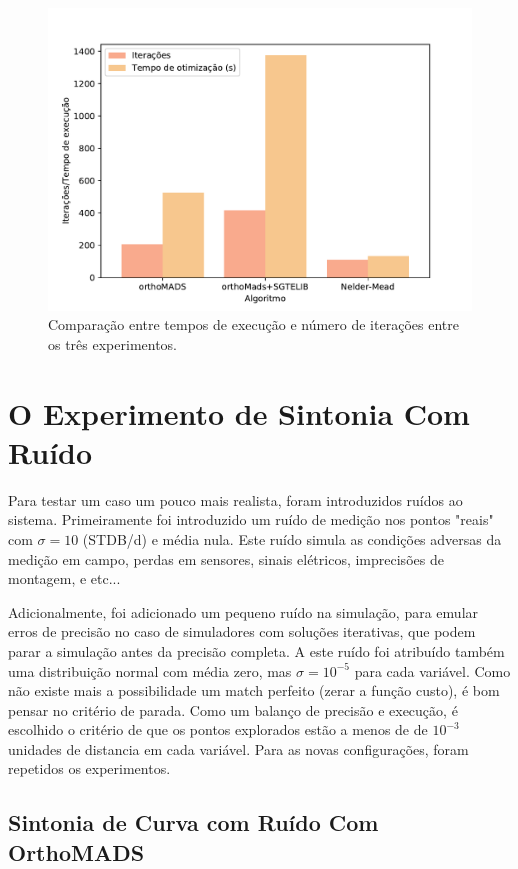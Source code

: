 \begin{figure}
\centering
  \includegraphics[width=0.7\linewidth]{figs/comp_time_iter.pdf}
  \caption{Comparação entre tempos de execução e número de iterações entre os três experimentos.}
  \label{fig:comp1}
\end{figure}


\chapter{O Experimento de Sintonia Com Ruído}

Para testar um caso um pouco mais realista, foram introduzidos ruídos ao sistema.
%
Primeiramente foi introduzido um ruído de medição nos pontos "reais" com $\sigma = 10$ (STDB/d) e média nula.
%
Este ruído simula as condições adversas da medição em campo, perdas em sensores, sinais elétricos, imprecisões de montagem, e etc...
%
%

Adicionalmente, foi adicionado um pequeno ruído na simulação, para emular erros de precisão no caso de simuladores com soluções iterativas, que podem parar a simulação antes da precisão completa. 
%
A este ruído foi atribuído também uma distribuição normal com média zero, mas $\sigma = 10^{-5}$ para cada variável.
%
Como não existe mais a possibilidade um match perfeito (zerar a função custo), é bom pensar no critério de parada. 
%
Como um balanço de precisão e execução, é escolhido o critério de que os pontos explorados estão a menos de de $10^{-3}$ unidades de distancia em cada variável.
%
Para as novas configurações, foram repetidos os experimentos.



\section{Sintonia de Curva com Ruído Com OrthoMADS}

